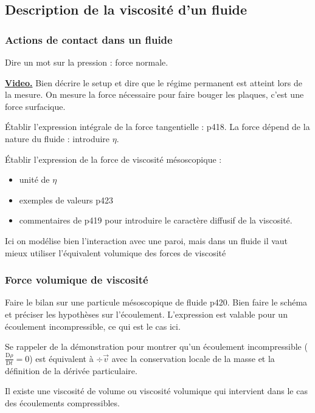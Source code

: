 \subsection{Description de la viscosité d'un fluide}

\subsubsection{Actions de contact dans un fluide}

Dire un mot sur la pression : force normale.

\begin{slide}
\href{https://youtu.be/pqWwHxn6LNo?t=213}{\textbf{Video.}}
Bien décrire le setup et dire que le régime permanent est atteint lors de la mesure.
On mesure la force nécessaire pour faire bouger les plaques, c'est une force surfacique.
\end{slide}
Établir l'expression intégrale de la force tangentielle : \cite{Olivier2000} p418.
La force dépend de la nature du fluide : introduire $\eta$.

Établir l'expression de la force de viscosité mésoscopique :
\begin{itemize}
\item unité de $\eta$
\item exemples de valeurs \cite{Olivier2000} p423
\item commentaires de \cite{Olivier2000} p419 pour introduire le caractère diffusif de la viscosité.
\end{itemize}

\begin{transition}
Ici on modélise bien l'interaction avec une paroi, mais dans un fluide il vaut mieux utiliser l'équivalent volumique des forces de viscosité 
\end{transition}

\subsubsection{Force volumique de viscosité}

Faire le bilan sur une particule mésoscopique de fluide \cite{Olivier2000} p420.
Bien faire le schéma et préciser les hypothèses sur l'écoulement.
L'expression est valable pour un écoulement incompressible, ce qui est le cas ici.

\begin{remarque}
Se rappeler de la démonstration pour montrer qu'un écoulement incompressible ($\frac{\mathrm{D}\rho}{\mathrm{D}t}=0$) est équivalent à $\div \overrightarrow{v}$ avec la conservation locale de la masse et la définition de la dérivée particulaire.

\noindent
Il existe une viscosité de volume ou viscosité volumique qui intervient dans le cas des écoulements compressibles.
\end{remarque}

